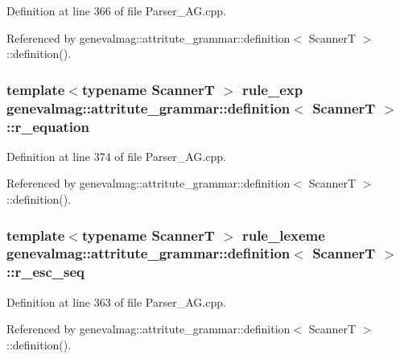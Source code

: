 Definition at line 366 of file Parser\_\-AG.cpp.



Referenced by genevalmag::attritute\_\-grammar::definition$<$ ScannerT $>$::definition().

\hypertarget{structgenevalmag_1_1attritute__grammar_1_1definition_a2e00d968a46bd87be46613a484dc1504}{
\subsubsection[{r\_\-equation}]{\setlength{\rightskip}{0pt plus 5cm}template$<$typename ScannerT $>$ {\bf rule\_\-exp} {\bf genevalmag::attritute\_\-grammar::definition}$<$ ScannerT $>$::{\bf r\_\-equation}}}
\label{structgenevalmag_1_1attritute__grammar_1_1definition_a2e00d968a46bd87be46613a484dc1504}


Definition at line 374 of file Parser\_\-AG.cpp.



Referenced by genevalmag::attritute\_\-grammar::definition$<$ ScannerT $>$::definition().

\hypertarget{structgenevalmag_1_1attritute__grammar_1_1definition_a3b5b8684d55c4095aef56309030035b3}{
\subsubsection[{r\_\-esc\_\-seq}]{\setlength{\rightskip}{0pt plus 5cm}template$<$typename ScannerT $>$ {\bf rule\_\-lexeme} {\bf genevalmag::attritute\_\-grammar::definition}$<$ ScannerT $>$::{\bf r\_\-esc\_\-seq}}}
\label{structgenevalmag_1_1attritute__grammar_1_1definition_a3b5b8684d55c4095aef56309030035b3}


Definition at line 363 of file Parser\_\-AG.cpp.



Referenced by genevalmag::attritute\_\-grammar::definition$<$ ScannerT $>$::definition().

